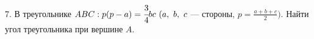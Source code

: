 7. В треугольнике $ABC: p(p-a)=\cfrac{3}{4}bc\ (a,\ b,\ c$ --- стороны, $p=\frac{a+b+c}{2}).$ Найти угол треугольника при вершине $A.$\\
